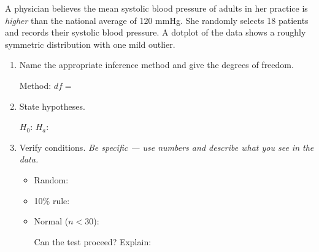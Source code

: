 \documentclass[10pt]{article}
\begin{document}
\namedateperiod

\vspace{0.15in}

A physician believes the mean systolic blood pressure of adults in her practice is
\emph{higher} than the national average of 120 mmHg. She randomly selects 18 patients
and records their systolic blood pressure. A dotplot of the data shows a roughly symmetric
distribution with one mild outlier.

\begin{enumerate}
  \item Name the appropriate inference method and give the degrees of freedom.

        Method: \blank{5cm} \quad $df = $ \blank{1.5cm}

  \item State hypotheses.

        $H_0$: \blank{5cm} \quad $H_a$: \blank{5cm}

  \item Verify conditions. \textit{Be specific --- use numbers and describe what you see in the data.}
        \begin{itemize}
          \item Random: \writeline
          \item 10\% rule: \writeline
          \item Normal ($n < 30$): \writeline

                Can the test proceed? \blank{2cm} \quad Explain: \writeline
        \end{itemize}
\end{enumerate}
\end{document}
